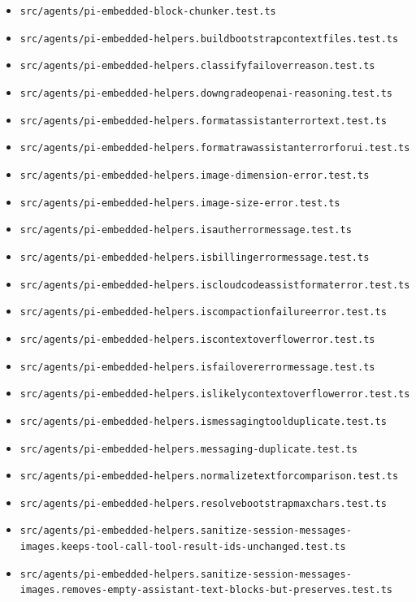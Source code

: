 \begin{itemize}
  \item \texttt{src/agents/pi-embedded-block-chunker.test.ts}
  \item \texttt{src/agents/pi-embedded-helpers.buildbootstrapcontextfiles.test.ts}
  \item \texttt{src/agents/pi-embedded-helpers.classifyfailoverreason.test.ts}
  \item \texttt{src/agents/pi-embedded-helpers.downgradeopenai-reasoning.test.ts}
  \item \texttt{src/agents/pi-embedded-helpers.formatassistanterrortext.test.ts}
  \item \texttt{src/agents/pi-embedded-helpers.formatrawassistanterrorforui.test.ts}
  \item \texttt{src/agents/pi-embedded-helpers.image-dimension-error.test.ts}
  \item \texttt{src/agents/pi-embedded-helpers.image-size-error.test.ts}
  \item \texttt{src/agents/pi-embedded-helpers.isautherrormessage.test.ts}
  \item \texttt{src/agents/pi-embedded-helpers.isbillingerrormessage.test.ts}
  \item \texttt{src/agents/pi-embedded-helpers.iscloudcodeassistformaterror.test.ts}
  \item \texttt{src/agents/pi-embedded-helpers.iscompactionfailureerror.test.ts}
  \item \texttt{src/agents/pi-embedded-helpers.iscontextoverflowerror.test.ts}
  \item \texttt{src/agents/pi-embedded-helpers.isfailovererrormessage.test.ts}
  \item \texttt{src/agents/pi-embedded-helpers.islikelycontextoverflowerror.test.ts}
  \item \texttt{src/agents/pi-embedded-helpers.ismessagingtoolduplicate.test.ts}
  \item \texttt{src/agents/pi-embedded-helpers.messaging-duplicate.test.ts}
  \item \texttt{src/agents/pi-embedded-helpers.normalizetextforcomparison.test.ts}
  \item \texttt{src/agents/pi-embedded-helpers.resolvebootstrapmaxchars.test.ts}
  \item \texttt{src/agents/pi-embedded-helpers.sanitize-session-messages-images.keeps-tool-call-tool-result-ids-unchanged.test.ts}
  \item \texttt{src/agents/pi-embedded-helpers.sanitize-session-messages-images.removes-empty-assistant-text-blocks-but-preserves.test.ts}

\end{itemize}
